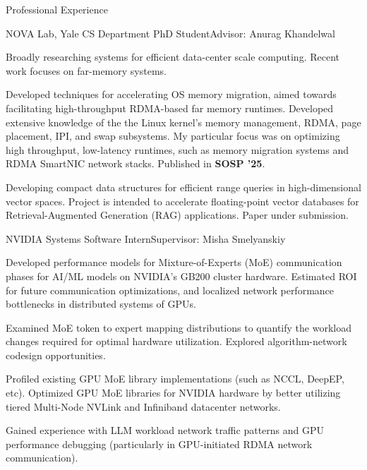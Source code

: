 \documentclass{resume} %
\begin{document}
\begin{resumeSection}{Professional Experience}

\begin{resumeSubsection}{NOVA Lab, Yale CS Department}
	{}{PhD Student}{Advisor: Anurag Khandelwal}
\item Broadly researching systems for efficient data-center scale computing.
	Recent work focuses on far-memory systems.
\item Developed techniques for accelerating OS memory migration, aimed towards
	facilitating high-throughput RDMA-based far memory runtimes.
	Developed extensive knowledge of the the Linux kernel's memory
	management, RDMA, page placement, IPI, and swap subsystems.
	My particular focus was on optimizing high throughput, low-latency runtimes,
	such as memory migration systems and RDMA SmartNIC network stacks.
	Published in \textbf{SOSP '25}. 
\item Developing compact data structures for efficient range queries in
	high-dimensional vector spaces. Project is intended to accelerate
	floating-point vector databases for Retrieval-Augmented Generation (RAG)
	applications. Paper under submission. 
\end{resumeSubsection}

\begin{resumeSubsection}{NVIDIA}
	{}{Systems Software Intern}{Supervisor: Misha Smelyanskiy}
\item Developed performance models for Mixture-of-Experts (MoE)
	communication phases for AI/ML models on NVIDIA's GB200 cluster hardware. 
	Estimated ROI for future communication optimizations, and localized
	network performance bottlenecks in distributed systems of GPUs. 
\item Examined MoE token to expert mapping distributions to quantify the workload changes
	required for optimal hardware utilization. Explored algorithm-network codesign opportunities. 
\item Profiled existing GPU MoE library implementations (such as NCCL, DeepEP, etc).
	Optimized GPU MoE libraries for NVIDIA hardware by better utilizing tiered
	Multi-Node NVLink and Infiniband datacenter networks. 
\item Gained experience with LLM workload network traffic patterns and 
	GPU performance debugging (particularly in GPU-initiated RDMA
	network communication). 
\end{resumeSubsection}


\end{resumeSection}
\end{document}
